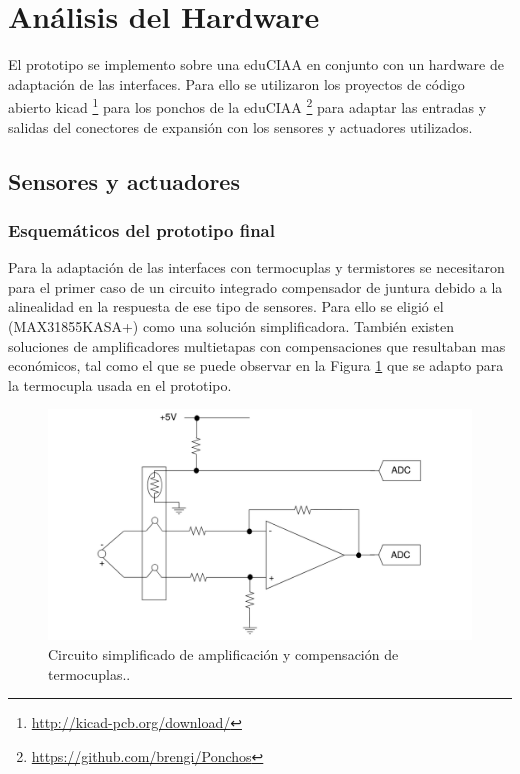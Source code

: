 \section{Análisis del Hardware}

El prototipo se implemento sobre una eduCIAA en conjunto con un hardware de adaptación de las interfaces. Para ello se utilizaron los proyectos de código abierto kicad \footnote{\url{http://kicad-pcb.org/download/}} para los ponchos de la eduCIAA \footnote{\url{https://github.com/brengi/Ponchos}} para adaptar las entradas y salidas del conectores de expansión con los sensores y actuadores utilizados. 

\subsection{Sensores y actuadores}

\subsubsection{Esquemáticos del prototipo final}
Para la adaptación de las interfaces con termocuplas y termistores se necesitaron para el primer caso de un circuito integrado compensador de juntura debido a la alinealidad en la respuesta de ese tipo de sensores. Para ello se eligió el (MAX31855KASA+) como una solución simplificadora. También existen soluciones de amplificadores multietapas con compensaciones que resultaban mas económicos, tal como el que se puede observar en la Figura \ref{fig:cirCompTermocupla} que se adapto para la termocupla usada en el prototipo.

\begin{figure}[h!]
	\centering
	\includegraphics[width=.7\textwidth]{Figures/circuito_ampl_termocupla}
	\caption{Circuito simplificado de amplificación y compensación de termocuplas.\protect\footnotemark.}
	\label{fig:cirCompTermocupla}
\end{figure}

